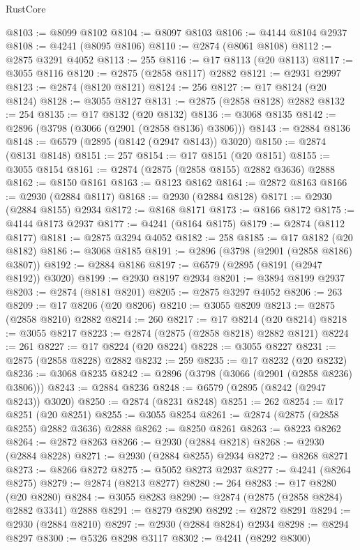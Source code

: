 \begin{lexlean}{RustCore}
\begin{coremodule}
@8103 := @8099 @8102
@8104 := @8097 @8103
@8106 := @4144 @8104 @2937
@8108 := @4241 (@8095 @8106)
@8110 := @2874 (@8061 @8108)
@8112 := @2875 @3291 @4052
@8113 := 255
@8116 := @17 @8113 (@20 @8113)
@8117 := @3055 @8116
@8120 := @2875 (@2858 @8117) @2882
@8121 := @2931 @2997
@8123 := @2874 (@8120 @8121)
@8124 := 256
@8127 := @17 @8124 (@20 @8124)
@8128 := @3055 @8127
@8131 := @2875 (@2858 @8128) @2882
@8132 := 254
@8135 := @17 @8132 (@20 @8132)
@8136 := @3068 @8135
@8142 := @2896 (@3798 (@3066 (@2901 (@2858 @8136) @3806)))
@8143 := @2884 @8136
@8148 := @6579 (@2895 (@8142 (@2947 @8143)) @3020)
@8150 := @2874 (@8131 @8148)
@8151 := 257
@8154 := @17 @8151 (@20 @8151)
@8155 := @3055 @8154
@8161 := @2874 (@2875 (@2858 @8155) @2882 @3636) @2888
@8162 := @8150 @8161
@8163 := @8123 @8162
@8164 := @2872 @8163
@8166 := @2930 (@2884 @8117)
@8168 := @2930 (@2884 @8128)
@8171 := @2930 (@2884 @8155) @2934
@8172 := @8168 @8171
@8173 := @8166 @8172
@8175 := @4144 @8173 @2937
@8177 := @4241 (@8164 @8175)
@8179 := @2874 (@8112 @8177)
@8181 := @2875 @3294 @4052
@8182 := 258
@8185 := @17 @8182 (@20 @8182)
@8186 := @3068 @8185
@8191 := @2896 (@3798 (@2901 (@2858 @8186) @3807))
@8192 := @2884 @8186
@8197 := @6579 (@2895 (@8191 (@2947 @8192)) @3020)
@8199 := @2930 @8197 @2934
@8201 := @3894 @8199 @2937
@8203 := @2874 (@8181 @8201)
@8205 := @2875 @3297 @4052
@8206 := 263
@8209 := @17 @8206 (@20 @8206)
@8210 := @3055 @8209
@8213 := @2875 (@2858 @8210) @2882
@8214 := 260
@8217 := @17 @8214 (@20 @8214)
@8218 := @3055 @8217
@8223 := @2874 (@2875 (@2858 @8218) @2882 @8121)
@8224 := 261
@8227 := @17 @8224 (@20 @8224)
@8228 := @3055 @8227
@8231 := @2875 (@2858 @8228) @2882
@8232 := 259
@8235 := @17 @8232 (@20 @8232)
@8236 := @3068 @8235
@8242 := @2896 (@3798 (@3066 (@2901 (@2858 @8236) @3806)))
@8243 := @2884 @8236
@8248 := @6579 (@2895 (@8242 (@2947 @8243)) @3020)
@8250 := @2874 (@8231 @8248)
@8251 := 262
@8254 := @17 @8251 (@20 @8251)
@8255 := @3055 @8254
@8261 := @2874 (@2875 (@2858 @8255) @2882 @3636) @2888
@8262 := @8250 @8261
@8263 := @8223 @8262
@8264 := @2872 @8263
@8266 := @2930 (@2884 @8218)
@8268 := @2930 (@2884 @8228)
@8271 := @2930 (@2884 @8255) @2934
@8272 := @8268 @8271
@8273 := @8266 @8272
@8275 := @5052 @8273 @2937
@8277 := @4241 (@8264 @8275)
@8279 := @2874 (@8213 @8277)
@8280 := 264
@8283 := @17 @8280 (@20 @8280)
@8284 := @3055 @8283
@8290 := @2874 (@2875 (@2858 @8284) @2882 @3341) @2888
@8291 := @8279 @8290
@8292 := @2872 @8291
@8294 := @2930 (@2884 @8210)
@8297 := @2930 (@2884 @8284) @2934
@8298 := @8294 @8297
@8300 := @5326 @8298 @3117
@8302 := @4241 (@8292 @8300)

\end{coremodule}
\end{lexlean}
